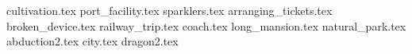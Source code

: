 \documentclass[11pt,a4paper,oneside,arabic,korean]{article}
\begin{document}
	


	{cultivation.tex}
	{port_facility.tex}
	{sparklers.tex}
	{arranging_tickets.tex}
	{broken_device.tex}
	{railway_trip.tex}
	{coach.tex}
	{long_mansion.tex}
	{natural_park.tex}
	{abduction2.tex}
	{city.tex}
	{dragon2.tex}
\end{document}
